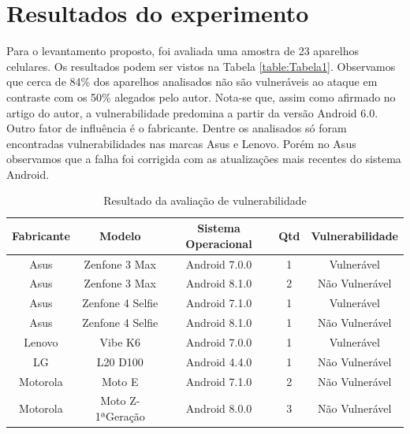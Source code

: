 \documentclass[12pt]{article}
\begin{document}
\section{Resultados do experimento}
Para o levantamento proposto, foi avaliada uma amostra de 23 aparelhos celulares. Os resultados podem ser vistos na Tabela \ref{table:Tabela1}. Observamos que cerca de 84\% dos aparelhos analisados não são vulneráveis ao ataque em contraste com os 50\% alegados pelo autor. Nota-se que, assim como afirmado no artigo do autor, a vulnerabilidade predomina a partir da versão Android 6.0. Outro fator de influência é o fabricante. Dentre os analisados só foram encontradas vulnerabilidades nas marcas Asus e Lenovo. Porém no Asus observamos que a falha foi corrigida com as atualizações mais recentes do sistema Android. 

\begin{table}[H]
\caption{Resultado da avaliação de vulnerabilidade}
\begin{tabular}{|c|c|c|c|c|}
\hline
\textbf{Fabricante} & \textbf{Modelo}   & \textbf{Sistema Operacional} & \multicolumn{1}{l|}{\textbf{Qtd}} & \textbf{Vulnerabilidade} \\ \hline
Asus                & Zenfone 3 Max     & Android 7.0.0                & 1                                 & Vulnerável               \\ \hline
Asus                & Zenfone 3 Max     & Android 8.1.0                & 2                                 & Não Vulnerável           \\ \hline
Asus                & Zenfone 4 Selfie  & Android 7.1.0                & 1                                 & Vulnerável               \\ \hline
Asus                & Zenfone 4 Selfie  & Android 8.1.0                & 1                                 & Não Vulnerável           \\ \hline
Lenovo              & Vibe K6           & Android 7.0.0                & 1                                 & Vulnerável               \\ \hline
LG                  & L20 D100          & Android 4.4.0                & 1                                 & Não Vulnerável           \\ \hline
Motorola            & Moto E            & Android 7.1.0                & 2                                 & Não Vulnerável           \\ \hline
Motorola            & Moto Z- 1ªGeração & Android 8.0.0                & 3                                 & Não Vulnerável           \\ \hline

\end{tabular}
\end{table}
\end{document}
